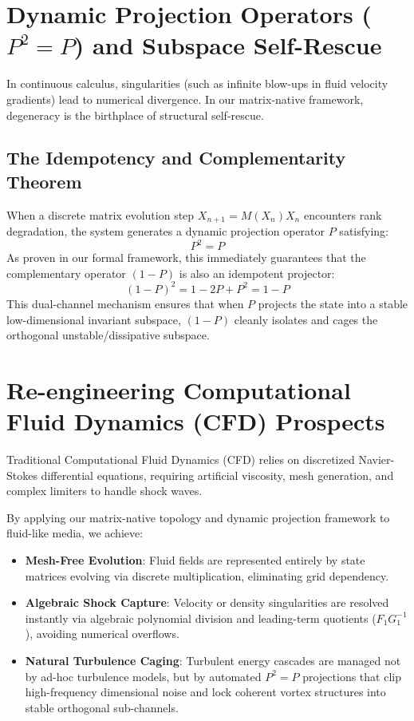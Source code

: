 \documentclass[11pt,a4paper]{article}
\begin{document}
\section{Dynamic Projection Operators ($P^2 = P$) and Subspace Self-Rescue}

In continuous calculus, singularities (such as infinite blow-ups in fluid velocity gradients) lead to numerical divergence. In our matrix-native framework, degeneracy is the birthplace of structural self-rescue.

\subsection{The Idempotency and Complementarity Theorem}
When a discrete matrix evolution step $X_{n+1} = M(X_n) X_n$ encounters rank degradation, the system generates a dynamic projection operator $P$ satisfying:
$$P^2 = P$$
As proven in our formal framework, this immediately guarantees that the complementary operator $(1 - P)$ is also an idempotent projector:
$$(1 - P)^2 = 1 - 2P + P^2 = 1 - P$$
This dual-channel mechanism ensures that when $P$ projects the state into a stable low-dimensional invariant subspace, $(1 - P)$ cleanly isolates and cages the orthogonal unstable/dissipative subspace.

\section{Re-engineering Computational Fluid Dynamics (CFD) Prospects}

Traditional Computational Fluid Dynamics (CFD) relies on discretized Navier-Stokes differential equations, requiring artificial viscosity, mesh generation, and complex limiters to handle shock waves. 

By applying our matrix-native topology and dynamic projection framework to fluid-like media, we achieve:
\begin{itemize}
    \item \textbf{Mesh-Free Evolution}: Fluid fields are represented entirely by state matrices evolving via discrete multiplication, eliminating grid dependency.
    \item \textbf{Algebraic Shock Capture}: Velocity or density singularities are resolved instantly via algebraic polynomial division and leading-term quotients ($F_1 G_1^{-1}$), avoiding numerical overflows.
    \item \textbf{Natural Turbulence Caging}: Turbulent energy cascades are managed not by ad-hoc turbulence models, but by automated $P^2 = P$ projections that clip high-frequency dimensional noise and lock coherent vortex structures into stable orthogonal sub-channels.
\end{itemize}
\end{document}
